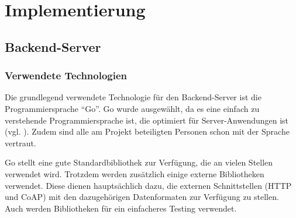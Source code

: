 \chapter{Implementierung} \label{chap:implementierung}

\section{Backend-Server}

\subsection{Verwendete Technologien} \label{sec:impl-server-technology}

Die grundlegend verwendete Technologie für den Backend-Server ist die Programmiersprache \enquote{Go}.
Go wurde ausgewählt, da es eine einfach zu verstehende Programmiersprache ist, die optimiert für Server-Anwendungen ist (vgl. \cite{Weigend2019}).
Zudem sind alle am Projekt beteiligten Personen schon mit der Sprache vertraut.

Go stellt eine gute Standardbibliothek zur Verfügung, die an vielen Stellen verwendet wird.
Trotzdem werden zusätzlich einige externe Bibliotheken verwendet.
Diese dienen hauptsächlich dazu, die externen Schnittstellen (\gls{HTTP} und \gls{CoAP}) mit den dazugehörigen Datenformaten zur Verfügung zu stellen.
Auch werden Bibliotheken für ein einfacheres Testing verwendet.

